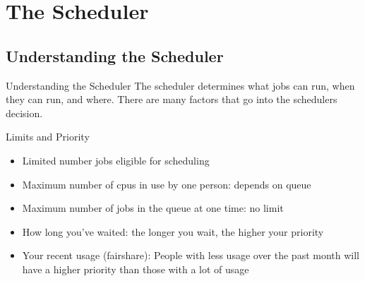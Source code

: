 \documentclass[handout]{beamer}
\begin{document}
\section{The Scheduler}
\subsection{Understanding the Scheduler}
\begin{frame}{Understanding the Scheduler}
The scheduler determines what jobs can run, when they can run, and where.  There
are many factors that go into the schedulers decision.
   \begin{block}{Limits and Priority}
    \begin{itemize}
    \item<1-> Limited number jobs eligible for scheduling
    \item<1-> Maximum number of cpus in use by one person: depends on queue
    \item<1-> Maximum number of jobs in the queue at one time: no limit
    \end{itemize}
    \begin{itemize}
    \item<2-> How long you've waited: the longer you wait, the higher your priority
    \item<2-> Your recent usage (fairshare): People with less usage over the past month will have a higher priority than those with a lot of usage

    \end{itemize}
   \end{block}
\end{frame}
\end{document}
